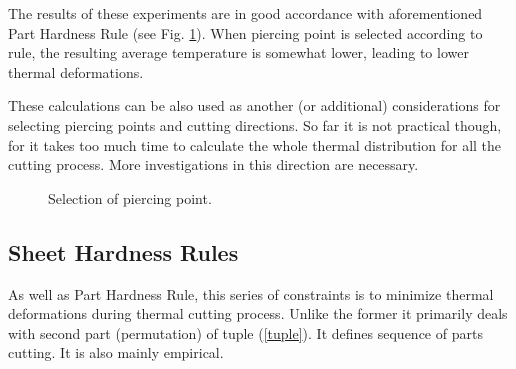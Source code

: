 \documentclass{../download/tPRS2e}
\begin{document}
The results of these experiments are in good accordance with aforementioned Part Hardness Rule
(see Fig. \ref{thermals}).
When piercing point is selected according to rule,
the resulting average temperature is somewhat lower, leading to lower thermal deformations.

These calculations can be also used as another (or additional) considerations for selecting piercing points and cutting directions.
So far it is not practical though, for it takes too much time to calculate the whole thermal distribution for all the cutting process.
More investigations in this direction are necessary.

\begin{figure}
\begin{center}
\caption{Selection of piercing point.}\label{thermals}
\end{center}
\end{figure}

\subsection{Sheet Hardness Rules}

As well as Part Hardness Rule, this series of constraints is to minimize thermal deformations during thermal cutting process.
Unlike the former it primarily deals with second part (permutation) of tuple (\ref{tuple}).
It defines sequence of parts cutting. It is also mainly empirical.
\end{document}
